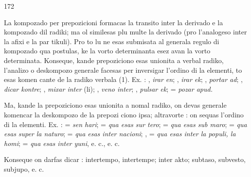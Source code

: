\begin{VUpage}[176]{172}

\VUsaut{5.79mm}

La kompozado per prepozicioni formacas la transito inter\nl
la derivado e la kompozado dil radiki; ma ol similesas plu\nl
multe la derivado (pro l'analogeso inter la afixi e la par\cc
tikuli). Pro to lu ne esas submisata al generala regulo di\nl
kompozado qua postulas, ke la vorto determinanta esez avan\nl
la vorto determinata. Konseque, kande prepoziciono esas\nl
unionita a verbal radiko, l'analizo o deskompozo generale\nl
facesas per inversigar l'ordino di la elementi, to esas komen\cc
cante de la radiko verbala (1). Ex. : , \textit{irar en}; ,\nl
\textit{irar ek}; , \textit{portar ad}; , \textit{dicar kontre};\nl
{}, \textit{mixar inter} (li); , \textit{veno inter}; \cc
{}, \textit{pulsar ek};  = \textit{pozar apud.}

Ma, kande la prepoziciono esas unionita a nomal radiko,\nl
on devas generale komencar la deskompozo de la prepozi\cc
ciono ipsa; altravorte : on sequas l'ordino di la elementi.\nl
Ex. :  = \textit{sen hari};  = \textit{qua esas sur tero};\nl
{} = \textit{qua esas sub maro};  = \textit{qua esas}\nl
\textit{super la naturo};  = \textit{qua esas inter nacioni};\nl
{},  = \textit{qua esas inter la populi, la homi};\nl
{} = \textit{qua esas inter yuni}, e. c., e. c.

Konseque on darfas dicar : intertempo, intertempe; inter\cc
akto; subtaso, subvesto, subjupo, e. c.


\end{VUpage}

